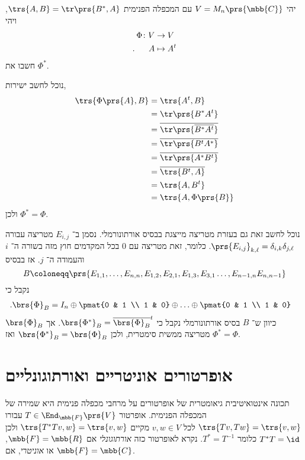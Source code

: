 \documentclass[a4paper,10pt,twoside,openany]{book}
\begin{document}
\begin{exercisechap}
יהי
$V = M_n\prs{\mbb{C}}$
עם המכפלה הפנימית
$\trs{A,B} = \tr\prs{B^*, A}$,
ויהי
\begin{align*}
    \Phi \colon V &\to V \\
    \text{.} \hphantom{lala} A &\mapsto A^t
\end{align*}
חשבו את
$\Phi^*$.
\end{exercisechap}

\begin{solution}
נוכל לחשב ישירות,
\begin{align*}
    \trs{\Phi\prs{A},B} &= \trs{A^t, B} \\&= \tr\prs{B^* A^t} \\&= \overline{\tr\prs{\overline{B^* A^t}}} \\&= \overline{\tr\prs{B^t A^*}} \\&= \overline{\tr\prs{A^* B^t}} \\&= \overline{\trs{B^t, A}} \\&= \trs{A, B^t} \\&= \trs{A, \Phi\prs{B}}
\end{align*}
ולכן
$\Phi^* = \Phi$.

נוכל לחשב זאת גם בעזרת מטריצה מייצגת בבסיס אורתונורמלי.
נסמן ב־%
$E_{i,j}$
מטריצה עבורה
$\prs{E_{i,j}}_{k,\ell} = \delta_{i,k} \delta_{j,\ell}$.
כלומר, זאת מטריצה עם
$0$
בכל המקדמים חוץ מזה בשורה ה־%
$i$
והעמודה ה־%
$j$.
אז בבסיס
\[B \coloneqq \prs{E_{1,1}, \ldots, E_{n,n}, E_{1,2}, E_{2,1}, E_{1,3}, E_{3,1} \ldots, E_{n-1, n} E_{n,n-1}}\]
נקבל כי
\begin{align*}
    \text{.} \brs{\Phi}_B &= I_n \oplus \pmat{0 & 1 \\ 1 & 0} \oplus \ldots \oplus \pmat{0 & 1 \\ 1 & 0}
\end{align*}
כיוון ש־%
$B$
בסיס אורתונורמלי
נקבל כי
$\brs{\Phi^*}_B = \overline{\brs{\Phi}_B}^t$.
אך
$\brs{\Phi}_B$
מטריצה ממשית סימטרית, ולכן
$\brs{\Phi^*}_B = \brs{\Phi}_B$
ואז
$\Phi^* = \Phi$.
\end{solution}

\section{אופרטורים אוניטריים ואורתוגונליים}

תכונה אינטואיטיבית גיאומטרית של אופרטורים על מרחבי מכפלה פנימית היא שמירה של המכפלה הפנימית.
אופרטור
$T \in \End_{\mbb{F}}\prs{V}$
עבורו
$\trs{Tv, Tw} = \trs{v,w}$
לכל
$v,w \in V$
מקיים
$\trs{T^* T v, w} = \trs{v,w}$
ולכן
$T^* T = \id$
כלומר
$T^* = T^{-1}$.
נקרא לאופרטור כזה
\emph{אורתוגונלי}
אם
$\mbb{F} = \mbb{R}$,
או
\emph{אוניטרי},
אם
$\mbb{F} = \mbb{C}$.
\end{document}
